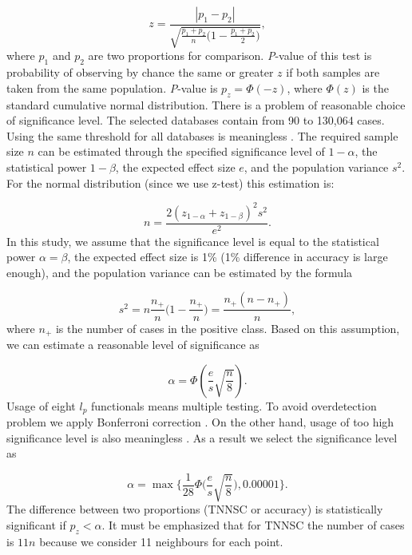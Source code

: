 \documentclass[entropy,article,submit,moreauthors,pdftex]{Definitions/mdpi}
\begin{document}
\begin{equation*}
z=\frac{|p_1 - p_2|}{\sqrt{\frac{p_1+p_2}{n}\big(1-\frac{p_1+p_2}{2}\big)}},
\end{equation*}
where $p_1$ and $p_2$ are two proportions for comparison. \emph{P}-value of this test is probability of observing by chance the same or greater $z$ if both samples are taken from the same population. \emph{P}-value is $p_z=\Phi(-z)$, where $\Phi(z)$ is the standard cumulative normal distribution.
There is a problem of reasonable choice of significance level. The selected databases contain from 90 to 130,064 cases. Using the same threshold for all databases is meaningless \cite{biau2008statistics, kadam2010sample}. The required sample size $n$ can be estimated through the specified significance level of $1-\alpha$, the statistical power $1-\beta$, the expected effect size $e$, and the population variance $s^2$. For the  normal distribution (since we use z-test) this estimation is:

\begin{equation*}
n=\frac{2(z_{1-\alpha}+z_{1-\beta})^2s^2}{e^2}.
\end{equation*}
In this study, we assume that the significance level is equal to the statistical power $\alpha=\beta$, the expected effect size is 1\% (1\% difference in accuracy is large enough), and the  population variance can be estimated by the formula

\begin{equation*}
s^2=n\frac{n_+}{n}\big(1-\frac{n_+}{n}\big)=\frac{n_+(n-n_+)}{n},
\end{equation*}
where $n_+$ is the number of cases in the positive class. Based on this assumption, we can estimate a reasonable level of significance as

\begin{equation*}
\alpha=\Phi\left(\frac{e}{s}\sqrt{\frac{n}{8}} \right).
\end{equation*}
Usage of eight $l_p$ functionals means multiple testing. To avoid overdetection problem we apply Bonferroni correction \cite{bonferroni1935calcolo}. On the other hand, usage of too high significance level is also meaningless \cite{biau2008statistics}. As a result we select the significance level as

\begin{equation*}
\alpha=\max \bigg \{\frac{1}{28}\Phi\bigg(\frac{e}{s}\sqrt{\frac{n}{8}} \bigg),0.00001\bigg \} .
\end{equation*}
The difference between two proportions (TNNSC or accuracy) is statistically significant if $p_z<\alpha$.
It must be emphasized that for TNNSC the number of cases is $11n$ because we consider 11 neighbours for each point.
\end{document}
